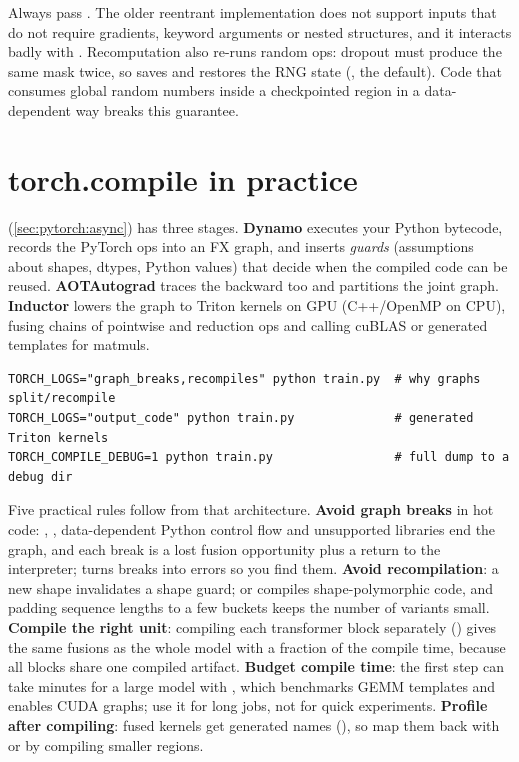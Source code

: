 \begin{pitfall}
Always pass . The older reentrant implementation does not support inputs
that do not require gradients, keyword arguments or nested structures, and it interacts badly with
. Recomputation also re-runs random ops: dropout must produce the same mask
twice, so  saves and restores the RNG state (, the
default). Code that consumes global random numbers inside a checkpointed region in a
data-dependent way breaks this guarantee.
\end{pitfall}

\section{torch.compile in practice}\label{sec:perf:compile}

 (\cref{sec:pytorch:async}) has three stages. \textbf{Dynamo} executes your
Python bytecode, records the PyTorch ops into an FX graph, and inserts \emph{guards} (assumptions
about shapes, dtypes, Python values) that decide when the compiled code can be reused.
\textbf{AOTAutograd} traces the backward too and partitions the joint graph. \textbf{Inductor}
lowers the graph to Triton kernels on GPU (C++/OpenMP on CPU), fusing chains of pointwise and
reduction ops and calling cuBLAS or generated templates for matmuls.

\begin{lstlisting}[style=shell,caption={Seeing what the compiler did.},label={lst:perf:compilelogs}]
TORCH_LOGS="graph_breaks,recompiles" python train.py  # why graphs split/recompile
TORCH_LOGS="output_code" python train.py              # generated Triton kernels
TORCH_COMPILE_DEBUG=1 python train.py                 # full dump to a debug dir
\end{lstlisting}

Five practical rules follow from that architecture. \textbf{Avoid graph breaks} in hot code:
, , data-dependent Python control flow and unsupported libraries end the
graph, and each break is a lost fusion opportunity plus a return to the interpreter;
 turns breaks into errors so you find them. \textbf{Avoid recompilation}: a new
shape invalidates a shape guard;  or  compiles
shape-polymorphic code, and padding sequence lengths to a few buckets keeps the number of variants
small. \textbf{Compile the right unit}: compiling each transformer block separately
() gives the same fusions as the whole model with a fraction of the compile
time, because all blocks share one compiled artifact. \textbf{Budget compile time}: the first step
can take minutes for a large model with , which benchmarks GEMM templates
and enables CUDA graphs; use it for long jobs, not for quick experiments. \textbf{Profile after
compiling}: fused kernels get generated names (), so map them
back with  or by compiling smaller regions.

